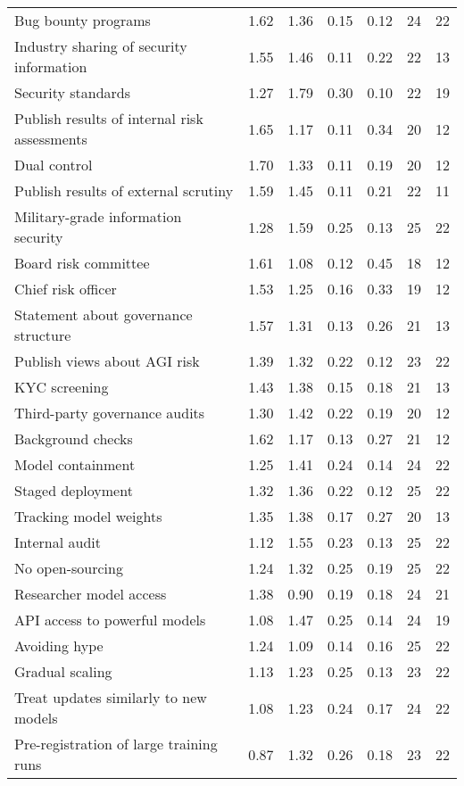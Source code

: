 \documentclass{article}
\begin{document}
\begin{sidewaystable}
\begin{tabular}{l*{6}{r}}
Bug bounty programs & 1.62 & 1.36 & 0.15 & 0.12 & 24 & 22 \\
Industry sharing of security information & 1.55 & 1.46 & 0.11 & 0.22 & 22 & 13 \\
Security standards & 1.27 & 1.79 & 0.30 & 0.10 & 22 & 19 \\
Publish results of internal risk assessments & 1.65 & 1.17 & 0.11 & 0.34 & 20 & 12 \\
Dual control & 1.70 & 1.33 & 0.11 & 0.19 & 20 & 12 \\
Publish results of external scrutiny & 1.59 & 1.45 & 0.11 & 0.21 & 22 & 11 \\
Military-grade information security & 1.28 & 1.59 & 0.25 & 0.13 & 25 & 22 \\
Board risk committee & 1.61 & 1.08 & 0.12 & 0.45 & 18 & 12 \\
Chief risk officer & 1.53 & 1.25 & 0.16 & 0.33 & 19 & 12 \\
Statement about governance structure & 1.57 & 1.31 & 0.13 & 0.26 & 21 & 13 \\
Publish views about AGI risk & 1.39 & 1.32 & 0.22 & 0.12 & 23 & 22 \\
KYC screening & 1.43 & 1.38 & 0.15 & 0.18 & 21 & 13 \\
Third-party governance audits & 1.30 & 1.42 & 0.22 & 0.19 & 20 & 12 \\
Background checks & 1.62 & 1.17 & 0.13 & 0.27 & 21 & 12 \\
Model containment & 1.25 & 1.41 & 0.24 & 0.14 & 24 & 22 \\
Staged deployment & 1.32 & 1.36 & 0.22 & 0.12 & 25 & 22 \\
Tracking model weights & 1.35 & 1.38 & 0.17 & 0.27 & 20 & 13 \\
Internal audit & 1.12 & 1.55 & 0.23 & 0.13 & 25 & 22 \\
No open-sourcing & 1.24 & 1.32 & 0.25 & 0.19 & 25 & 22 \\
Researcher model access & 1.38 & 0.90 & 0.19 & 0.18 & 24 & 21 \\
API access to powerful models & 1.08 & 1.47 & 0.25 & 0.14 & 24 & 19 \\
Avoiding hype & 1.24 & 1.09 & 0.14 & 0.16 & 25 & 22 \\
Gradual scaling & 1.13 & 1.23 & 0.25 & 0.13 & 23 & 22 \\
Treat updates similarly to new models & 1.08 & 1.23 & 0.24 & 0.17 & 24 & 22 \\
Pre-registration of large training runs & 0.87 & 1.32 & 0.26 & 0.18 & 23 & 22 \\

\end{tabular}
\end{sidewaystable}
\end{document}
